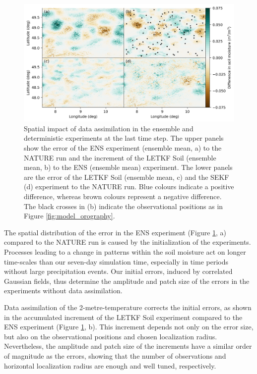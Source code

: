 \documentclass[HESSD, manuscript]{copernicus}
\begin{document}
\begin{figure}[ht]
	\includegraphics{figures/fig_06_spatial_impact.png}
	\caption{
		Spatial impact of data assimilation in the ensemble and deterministic experiments at the last time step.
		The upper panels show the error of the ENS experiment (ensemble mean, a) to the NATURE run and the increment of the LETKF Soil (ensemble mean, b) to the ENS (ensemble mean) experiment.
		The lower panels are the error of the LETKF Soil (ensemble mean, c) and the SEKF (d) experiment to the NATURE run.
		Blue colours indicate a positive difference, whereas brown colours represent a negative difference.
		The black crosses in (b) indicate the observational positions as in Figure \ref{fig:model_orography}.
	}
	\label{fig:spatial_impact}
\end{figure}


The spatial distribution of the error in the ENS experiment (Figure \ref{fig:spatial_impact}, a) compared to the NATURE run is caused by the initialization of the experiments.
Processes leading to a change in patterns within the soil moisture act on longer time-scales than our seven-day simulation time, especially in time periods without large precipitation events.
Our initial errors, induced by correlated Gaussian fields, thus determine the amplitude and patch size of the errors in the experiments without data assimilation.

Data assimilation of the 2-metre-temperature corrects the initial errors, as shown in the accumulated increment of the LETKF Soil experiment compared to the ENS experiment (Figure \ref{fig:spatial_impact}, b).
This increment depends not only on the error size, but also on the observational positions and chosen localization radius.
Nevertheless, the amplitude and patch size of the increments have a similar order of magnitude as the errors, showing that the number of observations and horizontal localization radius are enough and well tuned, respectively.
\end{document}
